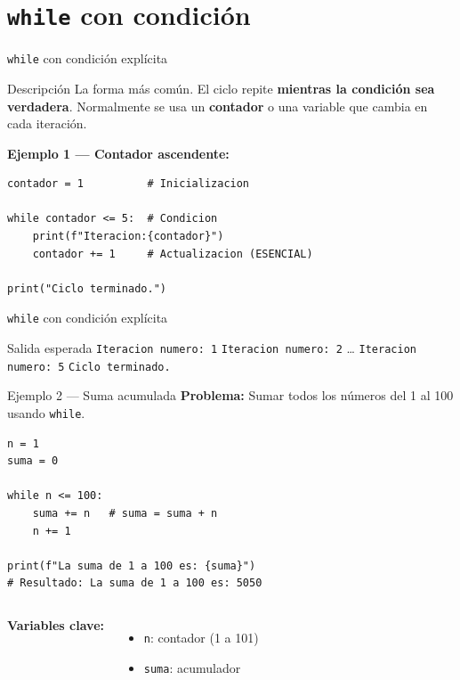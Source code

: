 \documentclass[aspectratio=169,xcolor=dvipsnames]{beamer}
\begin{document}
\section{\texttt{while} con condici\'on}

\begin{frame}[fragile]{\texttt{while} con condici\'on expl\'icita}
    \begin{block}{Descripci\'on}
        La forma m\'as com\'un. El ciclo repite \textbf{mientras la condici\'on sea verdadera}.
        Normalmente se usa un \textbf{contador} o una variable que cambia en cada iteraci\'on.
    \end{block}

    \vspace{0.2cm}
    \textbf{Ejemplo 1 --- Contador ascendente:}
\begin{lstlisting}[style=PythonStyle]
contador = 1          # Inicializacion

while contador <= 5:  # Condicion
    print(f"Iteracion:{contador}")
    contador += 1     # Actualizacion (ESENCIAL)

print("Ciclo terminado.")
\end{lstlisting}
\end{frame}
\begin{frame}[fragile]{\texttt{while} con condici\'on expl\'icita}

    \begin{exampleblock}{Salida esperada}
        \texttt{Iteracion numero: 1} \quad
        \texttt{Iteracion numero: 2} \quad \ldots \quad
        \texttt{Iteracion numero: 5} \quad
        \texttt{Ciclo terminado.}
    \end{exampleblock}
\end{frame}

\begin{frame}[fragile]{Ejemplo 2 --- Suma acumulada}
    \textbf{Problema:} Sumar todos los n\'umeros del 1 al 100 usando \texttt{while}.

\begin{lstlisting}[style=PythonStyle]
n = 1
suma = 0

while n <= 100:
    suma += n   # suma = suma + n
    n += 1

print(f"La suma de 1 a 100 es: {suma}")
# Resultado: La suma de 1 a 100 es: 5050
\end{lstlisting}

    \begin{columns}
        \textbf{Variables clave:}
        \begin{itemize}
            \item \texttt{n}: contador (1 a 101)
            \item \texttt{suma}: acumulador
        \end{itemize}
        
    \end{columns}
\end{frame}
\end{document}
